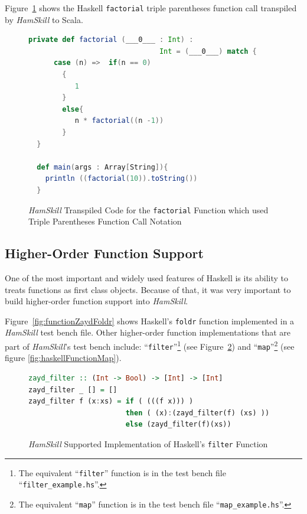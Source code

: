 \documentclass{report}
\begin{document}
Figure~\ref{fig:scalaFunctionFactorial} shows the Haskell \texttt{factorial} triple parentheses function call transpiled by \textit{HamSkill} to Scala.

\begin{figure}[H]
\begin{mdframed}
\begin{lstlisting}[language=Scala]
  private def factorial (___0___ : Int) :
                               Int = (___0___) match {
      case (n) =>  if(n == 0)
        {
           1
        }
        else{
           n * factorial((n -1))
        }
  } 
  
  def main(args : Array[String]){
    println ((factorial(10)).toString())
  } 
\end{lstlisting}
\end{mdframed}
\caption{\textit{HamSkill} Transpiled Code for the \texttt{factorial} Function which used Triple Parentheses Function Call Notation}\label{fig:scalaFunctionFactorial}
\end{figure}

\subsection{Higher-Order Function Support}\label{sec:higherOrderFunctions}

One of the most important and widely used features of Haskell is its ability to treats functions as first class objects.  Because of that, it was very important to build higher-order function support into \textit{HamSkill}.

Figure~\ref{fig:functionZaydFoldr} shows Haskell's \texttt{foldr} function implemented in a \textit{HamSkill} test bench file.  Other higher-order function implementations that are part of \textit{HamSkill}'s test bench include: ``\texttt{filter}''\footnote{The equivalent ``\texttt{filter}'' function is in the test bench file ``\texttt{filter\_example.hs}''.} (see Figure~\ref{fig:haskellFunctionFilter}) and ``\texttt{map}''\footnote{The equivalent ``\texttt{map}'' function is in the test bench file ``\texttt{map\_example.hs}''.} (see figure \ref{fig:haskellFunctionMap}).

\begin{figure}[H]
\begin{mdframed}
\begin{lstlisting}[language=Haskell, basicstyle=\small]
zayd_filter :: (Int -> Bool) -> [Int] -> [Int]
zayd_filter _ [] = []
zayd_filter f (x:xs) = if ( (((f x))) )
                       then ( (x):(zayd_filter(f) (xs) ))
                       else (zayd_filter(f)(xs))
\end{lstlisting}
\end{mdframed}
\caption{\textit{HamSkill} Supported Implementation of Haskell's \texttt{filter} Function}\label{fig:haskellFunctionFilter}
\end{figure}
\end{document}
